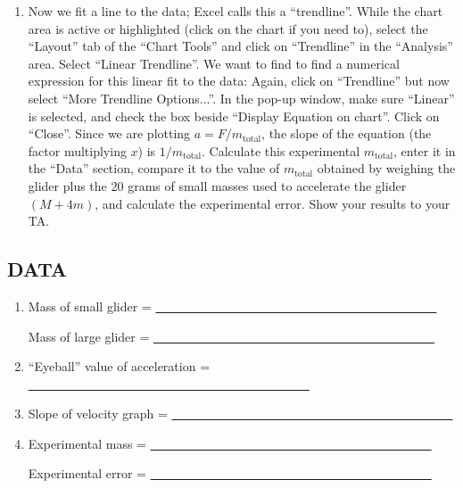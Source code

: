 \begin{enumerate}[label=\arabic*.]
\item Now we fit a line to the data; Excel calls this a ``trendline''.  While the chart area is active or highlighted (click on the chart if you need to), select the ``Layout'' tab of the ``Chart Tools'' and click on ``Trendline'' in the ``Analysis'' area.  Select ``Linear Trendline''.  We want to find to find a numerical expression for this linear fit to the data: Again, click on ``Trendline'' but now select ``More Trendline Options...''.  In the pop-up window, make sure ``Linear'' is selected, and check the box beside ``Display Equation on chart''.  Click on ``Close''.  Since we are plotting \(a = F/m_\text{total}\), the slope of the equation (the factor multiplying \(x\)) is \(1/m_\text{total}\).  Calculate this experimental \(m_\text{total}\), enter it in the ``Data'' section, compare it to the value of \(m_\text{total}\) obtained by weighing the glider plus the 20 grams of small masses used to accelerate the glider \((M+4m)\), and calculate the experimental error.  Show your results to your TA.


\end{enumerate}

\subsection*{DATA}

\begin{enumerate}[label=\arabic*.]

\item Mass of small glider = \ul{~~~~~~~~~~~~~~~~~~~~~~~~~~~~~~~~~~~~~~~~~~~~~}

Mass of large glider = \ul{~~~~~~~~~~~~~~~~~~~~~~~~~~~~~~~~~~~~~~~~~~~~~}

\setcounter{enumi}{4}
\item ``Eyeball'' value of acceleration = \ul{~~~~~~~~~~~~~~~~~~~~~~~~~~~~~~~~~~~~~~~~~~~~~}

\item Slope of velocity graph = \ul{~~~~~~~~~~~~~~~~~~~~~~~~~~~~~~~~~~~~~~~~~~~~~}

\setcounter{enumi}{16}
\item Experimental mass = \ul{~~~~~~~~~~~~~~~~~~~~~~~~~~~~~~~~~~~~~~~~~~~~~}

Experimental error = \ul{~~~~~~~~~~~~~~~~~~~~~~~~~~~~~~~~~~~~~~~~~~~~~}

\end{enumerate}

